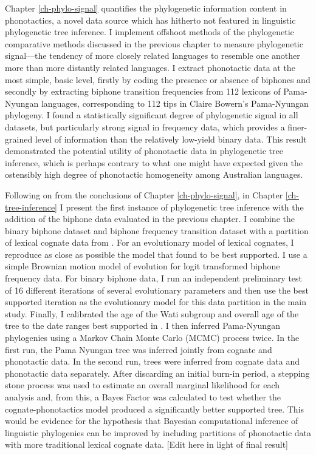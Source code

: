 Chapter \ref{ch-phylo-signal} quantifies the phylogenetic information content in phonotactics, a novel data source which has hitherto not featured in linguistic phylogenetic tree inference. I implement offshoot methods of the phylogenetic comparative methods discussed in the previous chapter to measure phylogenetic signal---the tendency of more closely related languages to resemble one another more than more distantly related languages. I extract phonotactic data at the most simple, basic level, firstly by coding the presence or absence of biphones and secondly by extracting biphone transition frequencies from 112 lexicons of Pama-Nyungan languages, corresponding to 112 tips in Claire Bowern's Pama-Nyungan phylogeny. I found a statistically significant degree of phylogenetic signal in all datasets, but particularly strong signal in frequency data, which provides a finer-grained level of information than the relatively low-yield binary data. This result demonstrated the potential utility of phonotactic data in phylogenetic tree inference, which is perhaps contrary to what one might have expected given the ostensibly high degree of phonotactic homogeneity among Australian languages.

Following on from the conclusions of Chapter \ref{ch-phylo-signal}, in Chapter \ref{ch-tree-inference} I present the first instance of phylogenetic tree inference with the addition of the biphone data evaluated in the previous chapter. I combine the binary biphone dataset and biphone frequency transition dataset with a partition of lexical cognate data from \textcite{bouckaert_origin_2018}. For an evolutionary model of lexical cognates, I reproduce as close as possible the model that \textcite{bouckaert_origin_2018} found to be best supported. I use a simple Brownian motion model of evolution for logit transformed biphone frequency data. For binary biphone data, I run an independent preliminary test of 16 different iterations of several evolutionary parameters and then use the best supported iteration as the evolutionary model for this data partition in the main study. Finally, I calibrated the age of the Wati subgroup and overall age of the tree to the date ranges best supported in \textcite{bouckaert_origin_2018}. I then inferred Pama-Nyungan phylogenies using a Markov Chain Monte Carlo (MCMC) process twice. In the first run, the Pama Nyungan tree was inferred jointly from cognate and phonotactic data. In the second run, trees were inferred from cognate data and phonotactic data separately. After discarding an initial burn-in period, a stepping stone process \autocite{baele_accurate_2013} was used to estimate an overall marginal likelihood for each analysis and, from this, a Bayes Factor was calculated to test whether the cognate-phonotactics model produced a significantly better supported tree. This would be evidence for the hypothesis that Bayesian computational inference of linguistic phylogenies can be improved by including partitions of phonotactic data with more traditional lexical cognate data. {[}Edit here in light of final result{]}

